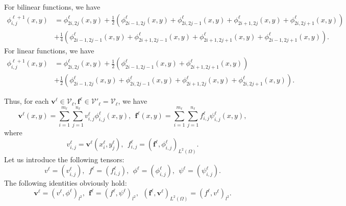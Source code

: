 \begin{lemma}
For bilinear functions, we have  
\begin{equation}\label{basis:plongation}
\begin{split}
\phi_{i,j}^{\ell+1}(x,y)&=\phi_{2i,2j}^{\ell}(x,y)+\frac{1}{2}\left(\phi_{2i-1,2j}^{\ell}(x,y)+\phi_{2i,2j-1}^{\ell}(x,y)
+\phi_{2i+1,2j}^{\ell}(x,y)+\phi_{2i,2j+1}^{\ell}(x,y)\right)\\
&+\frac{1}{4}\left(\phi_{2i-1,2j-1}^{\ell}(x,y)+\phi_{2i+1,2j-1}^{\ell}(x,y)
+\phi_{2i+1,2j+1}^{\ell}(x,y)+\phi_{2i-1,2j+1}^{\ell}(x,y)\right).
\end{split}
\end{equation}
For linear functions, we have  
\begin{equation}\label{basis:plongation2}
\begin{split}
\phi_{i,j}^{\ell+1}(x,y)&=\phi_{2i,2j}^{\ell}(x,y)
+\frac{1}{2}\left(\phi_{2i-1,2j-1}^{\ell}(x,y)+\phi_{2i+1,2j+1}^{\ell}(x,y)\right)\\
&+\frac{1}{2}\left(\phi_{2i-1,2j}^{\ell}(x,y)+\phi_{2i,2j-1}^{\ell}(x,y)
+\phi_{2i+1,2j}^{\ell}(x,y)+\phi_{2i,2j+1}^{\ell}(x,y)\right).
\end{split}
\end{equation}
\end{lemma}
Thus, for each $\mathbf v^{\boldsymbol {\ell}} \in \mathcal V_{\ell}, \mathbf f^{\boldsymbol {\ell}} \in \mathcal V'_{\ell}=\mathcal V_{\ell}$, we have 
\begin{equation}\label{expand}
\mathbf v^{\boldsymbol \ell}(x,y)=\sum_{i=1}^{m_\ell}\sum_{j=1}^{n_\ell}v^\ell_{i,j}\phi_{i,j}^\ell(x,y), 
~~ \mathbf f^{\boldsymbol \ell}(x,y)=\sum_{i=1}^{m_\ell}\sum_{j=1}^{n_\ell}f^\ell_{i,j}\psi_{i,j}^\ell(x,y),
\end{equation}
where
\begin{equation}
  \label{vf}
  v^\ell_{i,j}=\mathbf v^\ell(x_i^\ell,y_j^\ell),~~ f_{i,j}^\ell= (\mathbf f^\ell, \phi^\ell_{i,j})_{L^2(\Omega)}.
\end{equation}
Let us introduce the following tensors: 
\begin{equation}
  \label{v}
  v^\ell=(v^\ell_{i,j}),~~f^\ell=(f^\ell_{i,j}),~~\phi^\ell=(\phi^\ell_{i,j}),~~\psi^\ell=(\psi^\ell_{i,j}).
\end{equation}
The following identities obviously hold: 
$$
\mathbf v^\ell=(v^\ell, \phi^\ell)_{l^2},~~\mathbf f^\ell=(f^\ell, \psi^\ell)_{l^2},~~(\mathbf f^\ell,\mathbf v^\ell)_{L^2(\Omega)}=(f^\ell, v^\ell)_{l^2}.
$$

